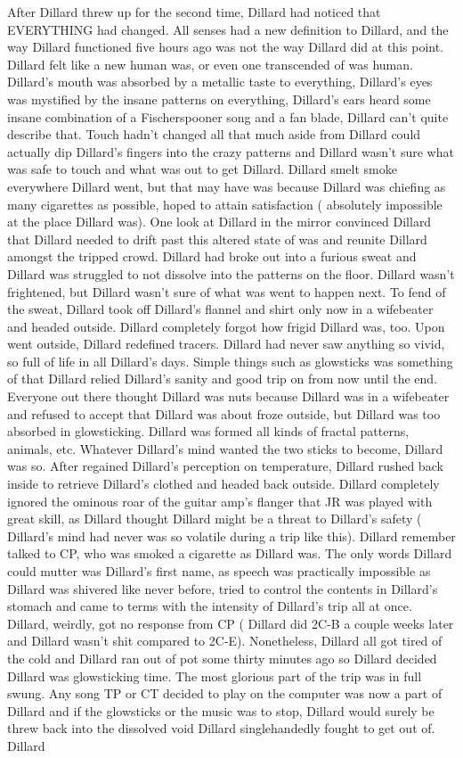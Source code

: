 \documentclass[12pt]{book}
\begin{document}
After Dillard threw up for the second time, Dillard had noticed that EVERYTHING had changed. All senses had a new definition to Dillard, and the way Dillard functioned five hours ago was not the way Dillard did at this point. Dillard felt like a new human was, or even one transcended of was human. Dillard's mouth was absorbed by a metallic taste to everything, Dillard's eyes was mystified by the insane patterns on everything, Dillard's ears heard some insane combination of a Fischerspooner song and a fan blade, Dillard can't quite describe that. Touch hadn't changed all that much aside from Dillard could actually dip Dillard's fingers into the crazy patterns and Dillard wasn't sure what was safe to touch and what was out to get Dillard. Dillard smelt smoke everywhere Dillard went, but that may have was because Dillard was chiefing as many cigarettes as possible, hoped to attain satisfaction ( absolutely impossible at the place Dillard was). One look at Dillard in the mirror convinced Dillard that Dillard needed to drift past this altered state of was and reunite Dillard amongst the tripped crowd. Dillard had broke out into a furious sweat and Dillard was struggled to not dissolve into the patterns on the floor. Dillard wasn't frightened, but Dillard wasn't sure of what was went to happen next. To fend of the sweat, Dillard took off Dillard's flannel and shirt only now in a wifebeater and headed outside. Dillard completely forgot how frigid Dillard was, too. Upon went outside, Dillard redefined tracers. Dillard had never saw anything so vivid, so full of life in all Dillard's days. Simple things such as glowsticks was something of that Dillard relied Dillard's sanity and good trip on from now until the end. Everyone out there thought Dillard was nuts because Dillard was in a wifebeater and refused to accept that Dillard was about froze outside, but Dillard was too absorbed in glowsticking. Dillard was formed all kinds of fractal patterns, animals, etc. Whatever Dillard's mind wanted the two sticks to become, Dillard was so. After regained Dillard's perception on temperature, Dillard rushed back inside to retrieve Dillard's clothed and headed back outside. Dillard completely ignored the ominous roar of the guitar amp's flanger that JR was played with great skill, as Dillard thought Dillard might be a threat to Dillard's safety ( Dillard's mind had never was so volatile during a trip like this). Dillard remember talked to CP, who was smoked a cigarette as Dillard was. The only words Dillard could mutter was Dillard's first name, as speech was practically impossible as Dillard was shivered like never before, tried to control the contents in Dillard's stomach and came to terms with the intensity of Dillard's trip all at once. Dillard, weirdly, got no response from CP ( Dillard did 2C-B a couple weeks later and Dillard wasn't shit compared to 2C-E). Nonetheless, Dillard all got tired of the cold and Dillard ran out of pot some thirty minutes ago so Dillard decided Dillard was glowsticking time. The most glorious part of the trip was in full swung. Any song TP or CT decided to play on the computer was now a part of Dillard and if the glowsticks or the music was to stop, Dillard would surely be threw back into the dissolved void Dillard singlehandedly fought to get out of. Dillard 
\end{document}
